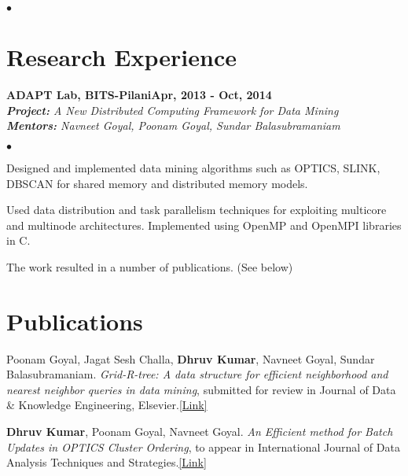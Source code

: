 \documentclass[margin,line]{res}
\newenvironment{list2}{
  \begin{list}{$\bullet$}{%
      \setlength{\itemsep}{0in}
      \setlength{\parsep}{0in} \setlength{\parskip}{0in}
      \setlength{\topsep}{0in} \setlength{\partopsep}{0in} 
      \setlength{\leftmargin}{0.2in}}}{\end{list}}
\begin{document}
\begin{resume}
\begin{list2}
\end{list2}


\section{\sc Research Experience}



{\bf ADAPT Lab, BITS-Pilani}\hfill {\bf Apr, 2013 - Oct, 2014}\\
{\em {\bf Project:} A New Distributed Computing Framework for Data Mining} \\
{\em {\bf Mentors:} Navneet Goyal, Poonam Goyal, Sundar Balasubramaniam}
\vspace{.3cm}
\begin{list2}
\item Designed and implemented data mining algorithms such as OPTICS, SLINK, DBSCAN for shared memory and
distributed memory models.
\item Used data distribution and task parallelism techniques for exploiting multicore and multinode
architectures. Implemented using OpenMP and OpenMPI libraries in C.
\item The work resulted in a number of publications. (See below)
\end{list2}

\section{\sc Publications}
Poonam Goyal, Jagat Sesh Challa, {\bf Dhruv Kumar}, Navneet Goyal, Sundar Balasubramaniam.
{\it Grid-R-tree: A data structure for efficient neighborhood and nearest neighbor queries in
data mining}, submitted for review in Journal of Data \& Knowledge Engineering, Elsevier.\href{https://drive.google.com/open?id=0B5R2WFoF983oN2dCcDJfaE9nVHM}{\color{blue}[Link]}

{\bf Dhruv Kumar}, Poonam Goyal, Navneet Goyal. {\it An Efficient method for Batch Updates in OPTICS Cluster Ordering}, to appear in International Journal of Data Analysis Techniques and
Strategies.\href{https://drive.google.com/open?id=0B5R2WFoF983oUmRrTWlBeWlQNWs}{\color{blue}[Link]}


\end{resume}
\end{document}
